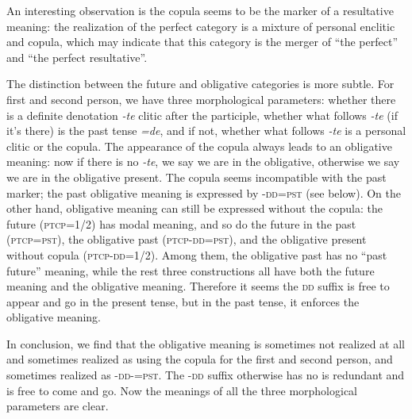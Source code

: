 \documentclass[a4paper, oneside, 12pt]{report}
\newcommand{\form}[1]{\emph{#1}}
\newcommand{\category}[1]{\textsc{#1}}
\begin{document}
An interesting observation is the copula seems to be the marker of a resultative meaning: 
the realization of the perfect category 
is a mixture of personal enclitic and copula, 
which may indicate that this category is the merger of ``the perfect'' and ``the perfect resultative''.

The distinction between the future and obligative categories is more subtle.
For first and second person, 
we have three morphological parameters:
whether there is a definite denotation \form{-te} clitic after the participle, 
whether what follows \form{-te} (if it's there) is 
the past tense \form{=de},
and if not, whether what follows \form{-te} is a personal clitic 
or the copula.
The appearance of the copula always leads to an obligative meaning:
now if there is no \form{-te}, 
we say we are in the obligative, 
otherwise we say we are in the obligative present. 
The copula seems incompatible with the past marker;
the past obligative meaning is expressed by -\category{dd}=\category{pst}
(see below).
On the other hand, obligative meaning can still be expressed 
without the copula:
the future (\category{ptcp}=\category{1/2}) has modal meaning, 
and so do the future in the past (\category{ptcp}=\category{pst}),
the obligative past (\category{ptcp}-\category{dd}=\category{pst}), 
and the obligative present without copula (\category{ptcp}-\category{dd}=\category{1/2}).
Among them, the obligative past has no ``past future'' meaning, 
while the rest three constructions all have both the future meaning 
and the obligative meaning.
Therefore it seems the \category{dd} suffix is free to appear and go 
in the present tense, 
but in the past tense, it enforces the obligative meaning.

In conclusion, we find that the obligative meaning is sometimes not realized at all 
and sometimes realized as using the copula for the first and second person,
and sometimes realized as \category{-dd}-\category{=pst}.
The \category{-dd} suffix otherwise has no is redundant and is free to come and go.
Now the meanings of all the three morphological parameters are clear.



\end{document}
